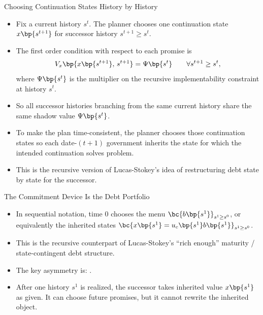 \documentclass[11pt,xcolor={dvipsnames},aspectratio=159,hyperref={pdftex,pdfpagemode=UseNone,hidelinks,pdfdisplaydoctitle=true},usepdftitle=false]{beamer}
\begin{document}
            \begin{frame}{Choosing Continuation States History by History}
                \begin{itemize}
                \item Fix a current history $s^t$. The planner chooses one continuation state $x\bp{s^{t+1}}$ for  successor history $s^{t+1}\ge s^t$.
                \item The first order condition with respect to each promise is
                \begin{align*}
                    V_x\bp{x\bp{s^{t+1}},\, s^{t+1}} = \Psi\bp{s^t}
                    \qquad \forall s^{t+1}\ge s^t,
                \end{align*}
                where $\Psi\bp{s^t}$ is the multiplier on the recursive implementability constraint at history $s^t$.
                \item So all successor histories branching from the same current history share the same shadow value $\Psi\bp{s^t}$.
                \item To make the plan time-consistent, the planner chooses those continuation states so each date-$(t+1)$ government inherits the state for which the intended continuation solves  problem.
                \item This is the recursive version of Lucas-Stokey's idea of restructuring debt state by state for the successor.
                \end{itemize}
            \end{frame}

	            \begin{frame}{The Commitment Device Is the Debt Portfolio}
	                \begin{itemize}
	                \item In sequential notation, time 0 chooses the menu $\bc{b\bp{s^1}}_{s^1\ge s^0}$, or equivalently the inherited states $\bc{x\bp{s^1}=u_c\bp{s^1}b\bp{s^1}}_{s^1\ge s^0}$.
	                \item This is the recursive counterpart of Lucas-Stokey's ``rich enough'' maturity / state-contingent debt structure.
	                \item The key asymmetry is: .
	                \item After one history $s^1$ is realized, the successor takes  inherited value $x\bp{s^1}$ as given. It can choose future promises, but it cannot rewrite the inherited object.
	                \end{itemize}
	            \end{frame}
\end{document}

